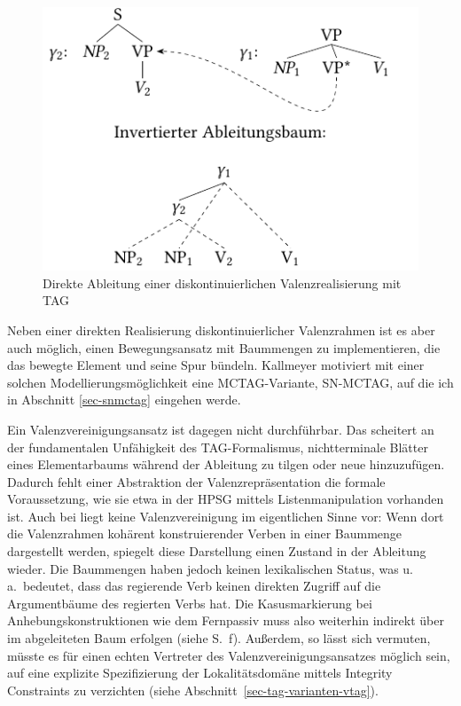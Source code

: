 \begin{figure}
\centering
\includegraphics[angle=90]{graphics/abb65.pdf}
\caption{\label{fig-kohaerenz-strategien-3}Direkte Ableitung einer diskontinuierlichen Valenzrealisierung mit TAG}
\end{figure}

Neben einer direkten Realisierung diskontinuierlicher Valenzrahmen ist es aber auch möglich, einen Bewegungsansatz mit Baummengen zu implementieren, die das bewegte Element und seine Spur bündeln. Kallmeyer motiviert mit einer solchen Modellierungsmöglichkeit eine MCTAG-Variante, SN-MCTAG, auf die ich in Abschnitt \ref{sec-snmctag} eingehen werde. 

Ein Valenzvereinigungsansatz ist dagegen nicht durchführbar. Das scheitert an der fundamentalen Unfähigkeit des TAG-Formalismus, nichtterminale Blätter eines Elementarbaums während der Ableitung zu tilgen oder neue hinzuzufügen. Dadurch fehlt einer Abstraktion der Valenzrepräsentation die formale Voraussetzung, wie sie etwa in der HPSG mittels Listenmanipulation vorhanden ist. Auch bei \citet[171]{Rambow:94} liegt keine Valenzvereinigung im eigentlichen Sinne vor: Wenn dort die Valenzrahmen kohärent konstruierender Verben in einer Baummenge dargestellt werden, spiegelt diese Darstellung  einen Zustand in der Ableitung wieder. Die Baummengen haben jedoch keinen lexikalischen Status, was u.\,a.\ bedeutet, dass das regierende Verb keinen direkten Zugriff auf die Argumentbäume des regierten Verbs hat. Die Kasusmarkierung bei Anhebungskonstruktionen wie dem Fernpassiv muss also weiterhin indirekt über  im abgeleiteten Baum erfolgen (siehe S.~\pageref{sec-ttmctag-fern}f). Au\ss erdem, so lässt sich vermuten, müsste es für einen echten Vertreter des Valenzvereinigungsansatzes möglich sein, auf eine explizite Spezifizierung der Lokalitätsdomäne mittels Integrity Constraints zu verzichten (siehe Abschnitt~\ref{sec-tag-varianten-vtag}).




